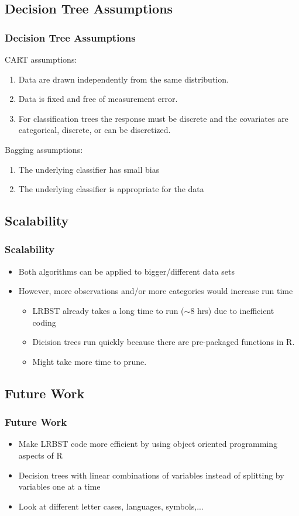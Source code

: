 \documentclass{beamer}
\begin{document}
\subsection{Decision Tree Assumptions}
\begin{frame}
\frametitle{Decision Tree Assumptions}
CART assumptions:
\begin{enumerate}
\item Data are drawn independently from the same distribution.
\item Data is fixed and free of measurement error.
\item For classification trees the response must be discrete and the covariates are categorical, discrete, or can be discretized.
\end{enumerate}
Bagging assumptions:
\begin{enumerate}
\item The underlying classifier has small bias
\item The underlying classifier is appropriate for the data
\end{enumerate}
\end{frame}


\subsection{Scalability}
\begin{frame}
\frametitle{Scalability}
\begin{itemize}
\item Both algorithms can be applied to bigger/different data sets 
\item However, more observations and/or more categories would increase run time 
\begin{itemize}
\item LRBST already takes a long time to run ($\sim 8$ hrs) due to inefficient coding 
\item Dicision trees run quickly because there are pre-packaged functions in R. 
\item Might take more time to prune. 
\end{itemize}
\end{itemize}
\end{frame}


\subsection{Future Work}
\begin{frame}
\frametitle{Future Work}
\begin{itemize}
\item Make LRBST code more efficient by using object oriented programming aspects of R 
\item Decision trees with linear combinations of variables instead of splitting by variables one at a time 
\item Look at different letter cases, languages, symbols,...
\end{itemize}
\end{frame}
\end{document}
